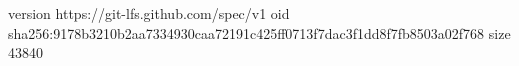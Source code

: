 version https://git-lfs.github.com/spec/v1
oid sha256:9178b3210b2aa7334930caa72191c425ff0713f7dac3f1dd8f7fb8503a02f768
size 43840
